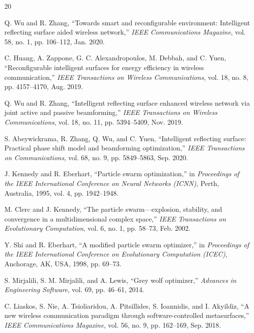 \documentclass[12pt,a4paper]{article}
\begin{document}

\begin{thebibliography}{20}

Q. Wu and R. Zhang, ``Towards smart and reconfigurable environment: Intelligent reflecting surface aided wireless network,'' \textit{IEEE Communications Magazine}, vol. 58, no. 1, pp. 106--112, Jan. 2020.

C. Huang, A. Zappone, G. C. Alexandropoulos, M. Debbah, and C. Yuen, ``Reconfigurable intelligent surfaces for energy efficiency in wireless communication,'' \textit{IEEE Transactions on Wireless Communications}, vol. 18, no. 8, pp. 4157--4170, Aug. 2019.

Q. Wu and R. Zhang, ``Intelligent reflecting surface enhanced wireless network via joint active and passive beamforming,'' \textit{IEEE Transactions on Wireless Communications}, vol. 18, no. 11, pp. 5394--5409, Nov. 2019.

S. Abeywickrama, R. Zhang, Q. Wu, and C. Yuen, ``Intelligent reflecting surface: Practical phase shift model and beamforming optimization,'' \textit{IEEE Transactions on Communications}, vol. 68, no. 9, pp. 5849--5863, Sep. 2020.

J. Kennedy and R. Eberhart, ``Particle swarm optimization,'' in \textit{Proceedings of the IEEE International Conference on Neural Networks (ICNN)}, Perth, Australia, 1995, vol. 4, pp. 1942--1948.

M. Clerc and J. Kennedy, ``The particle swarm---explosion, stability, and convergence in a multidimensional complex space,'' \textit{IEEE Transactions on Evolutionary Computation}, vol. 6, no. 1, pp. 58--73, Feb. 2002.

Y. Shi and R. Eberhart, ``A modified particle swarm optimizer,'' in \textit{Proceedings of the IEEE International Conference on Evolutionary Computation (ICEC)}, Anchorage, AK, USA, 1998, pp. 69--73.

S. Mirjalili, S. M. Mirjalili, and A. Lewis, ``Grey wolf optimizer,'' \textit{Advances in Engineering Software}, vol. 69, pp. 46--61, 2014.

C. Liaskos, S. Nie, A. Tsioliaridou, A. Pitsillides, S. Ioannidis, and I. Akyildiz, ``A new wireless communication paradigm through software-controlled metasurfaces,'' \textit{IEEE Communications Magazine}, vol. 56, no. 9, pp. 162--169, Sep. 2018.


\end{thebibliography}
\end{document}
